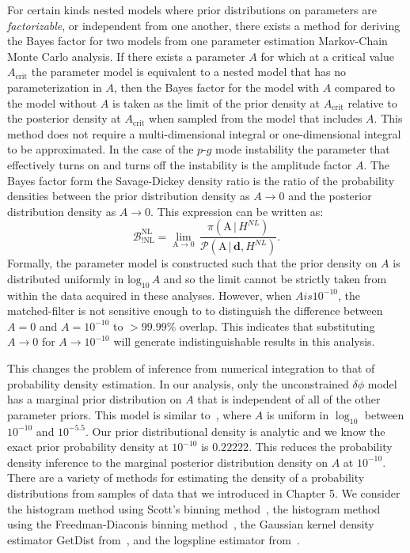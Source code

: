 For certain kinds nested models where prior distributions on parameters are \textit{factorizable}, or independent from one another, there exists a method for deriving the Bayes factor for two models from one parameter estimation Markov-Chain Monte Carlo analysis. If there exists a parameter $A$ for which at a critical value $A_\mathrm{crit}$ the parameter model is equivalent to a nested model that has no parameterization in $A$, then the Bayes factor for the model with $A$ compared to the model without $A$ is taken as the limit of the prior density at $A_\mathrm{crit}$ relative to the posterior density at $A_\mathrm{crit}$ when sampled from the model that includes $A$. This method does not require a multi-dimensional integral or one-dimensional integral to be approximated. In the case of the $p$-$g$ mode instability the parameter that effectively turns on and turns off the instability is the amplitude factor $A$. The Bayes factor form the Savage-Dickey density ratio is the ratio of the probability densities between the prior distribution density as $A \to 0$ and the posterior distribution density as $A \to 0$. This expression can be written as:
\begin{equation}\label{eq:sddr_bayes_factor}
    \mathcal{B}^{\mathrm{NL}}_{\mathrm{!NL}} = \lim_{\mathrm{A} \to 0} \, \frac{\pi\left(\mathrm{A} \, | \,  H^{NL}\right)}{\mathcal{P}\left(\mathrm{A} \, | \, \mathbf{d}, H^{NL}\right)}.
\end{equation}
Formally, the parameter model is constructed such that the prior density on $A$ is distributed uniformly in $\mathrm{log}_{10} \, A$ and so the limit cannot be strictly taken from within the data acquired in these analyses. However, when $A is 10^{-10}$, the matched-filter is not sensitive enough to to distinguish the difference between $A=0$ and $A=10^{-10}$ to $> 99.99\%$ overlap. This indicates that substituting $A \to 0$ for $A \to 10^{-10}$ will generate indistinguishable results in this analysis.

This changes the problem of inference from numerical integration to that of probability density estimation. In our analysis, only the unconstrained $\delta \phi$ model has a marginal prior distribution on $A$ that is independent of all of the other parameter priors. This model is similar to~\cite{abbott2019constraining}, where $A$ is uniform in $\log_{10}$ between $10^{-10}$ and $10^{-5.5}$. Our prior distributional density is analytic and we know the exact prior probability density at $10^{-10}$ is $0.2\overbar{2222}$. This reduces the probability density inference to the marginal posterior distribution density on $A$ at $10^{-10}$. There are a variety of methods for estimating the density of a probability distributions from samples of data that we introduced in Chapter 5. We consider the histogram method using Scott's binning method~\cite{scott1979optimal}, the histogram method using the Freedman-Diaconis binning method~\cite{Freedman1981}, the Gaussian kernel density estimator GetDist from~\cite{lewis2015getdist}, and the logspline estimator from~\citep{stone1997polynomial}.

